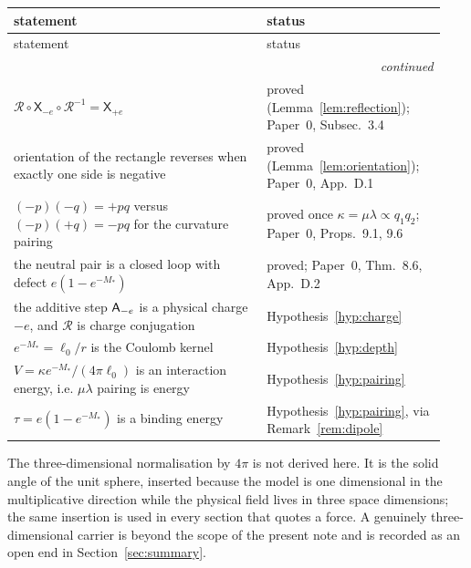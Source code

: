 {\small
\renewcommand{\arraystretch}{1.22}%
\begin{longtable}{@{}p{0.55\linewidth}p{0.39\linewidth}@{}}
\toprule
statement & status \\
\midrule
\endfirsthead
\toprule
statement & status \\
\midrule
\endhead
\midrule
\multicolumn{2}{r}{\emph{continued}}\\
\endfoot
\bottomrule
\endlastfoot
$\mathcal R\circ\mathsf X_{-e}\circ\mathcal R^{-1}=\mathsf X_{+e}$
& proved (Lemma~\ref{lem:reflection}); Paper~0, Subsec.~3.4 \\
orientation of the rectangle reverses when exactly one side is negative
& proved (Lemma~\ref{lem:orientation}); Paper~0, App.~D.1 \\
$(-p)(-q)=+pq$ versus $(-p)(+q)=-pq$ for the curvature pairing
& proved once $\kappa=\mu\lambda\propto q_1q_2$; Paper~0, Props.~9.1, 9.6 \\
the neutral pair is a closed loop with defect $e(1-e^{-M_*})$
& proved; Paper~0, Thm.~8.6, App.~D.2 \\
\midrule
the additive step $\mathsf A_{-e}$ is a physical charge $-e$, and
$\mathcal R$ is charge conjugation
& Hypothesis~\ref{hyp:charge} \\
$e^{-M_*}=\ell_0/r$ is the Coulomb kernel
& Hypothesis~\ref{hyp:depth} \\
$V=\kappa e^{-M_*}/(4\pi\ell_0)$ is an interaction energy, i.e.
$\mu\lambda$ pairing is energy
& Hypothesis~\ref{hyp:pairing} \\
$\tau=e(1-e^{-M_*})$ is a binding energy
& Hypothesis~\ref{hyp:pairing}, via Remark~\ref{rem:dipole} \\
\end{longtable}}

The three-dimensional normalisation by $4\pi$ is not derived here.  It is the
solid angle of the unit sphere, inserted because the \AEG{} model is one
dimensional in the multiplicative direction while the physical field lives in
three space dimensions; the same insertion is used in every section that quotes
a force.  A genuinely three-dimensional carrier is beyond the scope of the
present note and is recorded as an open end in Section~\ref{sec:summary}.

